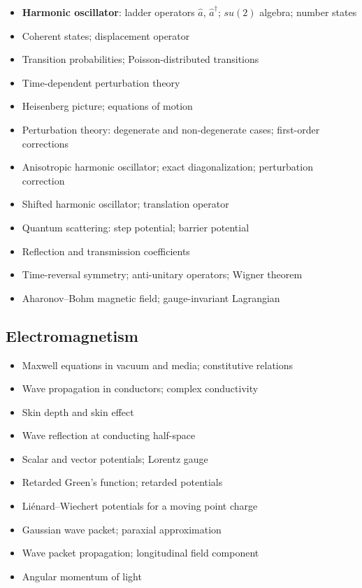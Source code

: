 \documentclass{amsart}
\begin{document}
\begin{itemize}
  \item \textbf{Harmonic oscillator}: ladder operators $\hat a$, $\hat a^\dagger$; $su(2)$ algebra; number states
  \item Coherent states; displacement operator
  \item Transition probabilities; Poisson-distributed transitions
  \item Time-dependent perturbation theory
  \item Heisenberg picture; equations of motion
  \item Perturbation theory: degenerate and non-degenerate cases; first-order corrections
  \item Anisotropic harmonic oscillator; exact diagonalization; perturbation correction
  \item Shifted harmonic oscillator; translation operator
  \item Quantum scattering: step potential; barrier potential
  \item Reflection and transmission coefficients
  \item Time-reversal symmetry; anti-unitary operators; Wigner theorem
  \item Aharonov--Bohm magnetic field; gauge-invariant Lagrangian
\end{itemize}

\subsection{Electromagnetism}

\begin{itemize}
  \item Maxwell equations in vacuum and media; constitutive relations
  \item Wave propagation in conductors; complex conductivity
  \item Skin depth and skin effect
  \item Wave reflection at conducting half-space
  \item Scalar and vector potentials; Lorentz gauge
  \item Retarded Green's function; retarded potentials
  \item Li\'enard--Wiechert potentials for a moving point charge
  \item Gaussian wave packet; paraxial approximation
  \item Wave packet propagation; longitudinal field component
  \item Angular momentum of light
\end{itemize}
\end{document}
